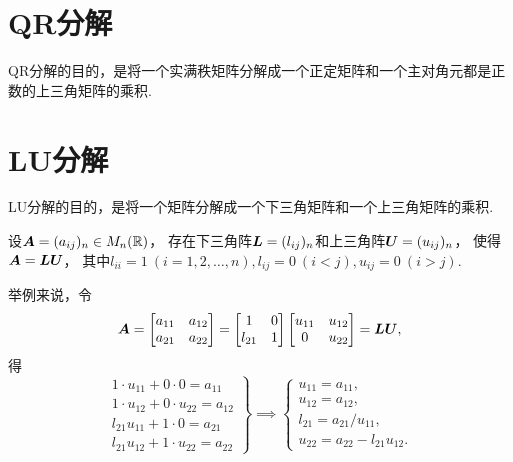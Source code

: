 \section{QR分解}
QR分解的目的，是将一个实满秩矩阵分解成一个正定矩阵和一个主对角元都是正数的上三角矩阵的乘积.

\section{LU分解}
LU分解的目的，是将一个矩阵分解成一个下三角矩阵和一个上三角矩阵的乘积.

\begin{theorem}
设\(\boldsymbol{A} = (a_{ij})_n \in M_n(\mathbb{R})\)，
存在下三角阵\(\boldsymbol{L} = (l_{ij})_n\)和上三角阵\(\boldsymbol{U} = (u_{ij})_n\)，
使得\(\boldsymbol{A} = \boldsymbol{L} \boldsymbol{U}\)，
其中\(l_{ii} = 1\ (i=1,2,\dotsc,n),
l_{ij} = 0\ (i<j),
u_{ij} = 0\ (i>j)\).
\end{theorem}

举例来说，令\begin{equation*}
	\boldsymbol{A} = \begin{bmatrix}
		a_{11} & a_{12} \\
		a_{21} & a_{22}
	\end{bmatrix}
	= \begin{bmatrix}
		1 & 0 \\
		l_{21} & 1
	\end{bmatrix}
	\begin{bmatrix}
		u_{11} & u_{12} \\
		0 & u_{22}
	\end{bmatrix}
	= \boldsymbol{L} \boldsymbol{U},
\end{equation*}
得\begin{equation*}
	\left.\begin{array}{r}
		1 \cdot u_{11} + 0 \cdot 0 = a_{11} \\
		1 \cdot u_{12} + 0 \cdot u_{22} = a_{12} \\
		l_{21} u_{11} + 1 \cdot 0 = a_{21} \\
		l_{21} u_{12} + 1 \cdot u_{22} = a_{22}
	\end{array}\right\}
	\implies
	\left\{\begin{array}{l}
		u_{11} = a_{11}, \\
		u_{12} = a_{12}, \\
		l_{21} = a_{21} / u_{11}, \\
		u_{22} = a_{22} - l_{21} u_{12}.
	\end{array}\right.
\end{equation*}

